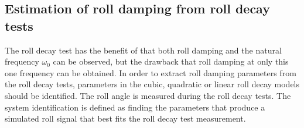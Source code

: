 \subsection{Estimation of roll damping from roll decay tests}
\label{se:experimental_estimation}
The roll decay test has the benefit of that both roll damping and the natural frequency $\omega_0$ can be observed, but the drawback that roll damping at only this one frequency can be obtained. In order to extract roll damping parameters from the roll decay tests, parameters in the cubic, quadratic or linear roll decay models should be identified. The roll angle is measured during the roll decay tests. The system identification is defined as finding the parameters that produce a simulated roll signal that best fits the roll decay test measurement. 



%
%
%
%





